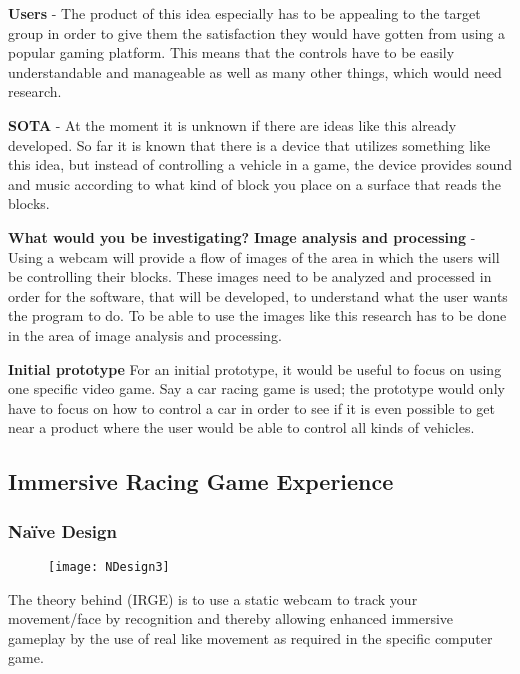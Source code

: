 \noindent\textbf{Users} - The product of this idea especially has to be appealing to the target group in order to give them the satisfaction they would have gotten from using a popular gaming platform. This means that the controls have to be easily understandable and manageable as well as many other things, which would need research.
\bigskip

\noindent\textbf{SOTA} - At the moment it is unknown if there are ideas like this already developed. So far it is known that there is a device that utilizes something like this idea, but instead of controlling a vehicle in a game, the device provides sound and music according to what kind of block you place on a surface that reads the blocks.
\bigskip

\noindent\textbf{What would you be investigating?} \newline
\noindent\textbf{Image analysis and processing} - 
Using a webcam will provide a flow of images of the area in which the users will be controlling their blocks. These images need to be analyzed and processed in order for the software, that will be developed, to understand what the user wants the program to do. To be able to use the images like this research has to be done in the area of image analysis and processing.
\bigskip

\noindent\textbf{Initial prototype} \newline
For an initial prototype, it would be useful to focus on using one specific video game. Say a car racing game is used; the prototype would only have to focus on how to control a car in order to see if it is even possible to get near a product where the user would be able to control all kinds of vehicles.

\pagebreak

\subsection{Immersive Racing Game Experience} \label{nd3}
\subsubsection*{Naïve Design}
\begin{figure}[h]
\centering
\texttt{[image: NDesign3]}
\caption{}
\label{fig:ndesign3}
\end{figure}
The theory behind (IRGE) is to use a static webcam to track your movement/face by recognition and thereby allowing enhanced immersive gameplay by the use of real like movement as required in the specific computer game.



